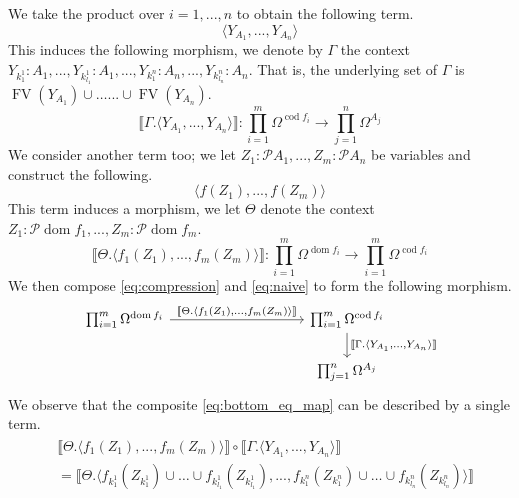 \documentclass{birkjour}
\theoremstyle{plain}
\theoremstyle{definition}
\newcommand{\call}[1]{\mathcal{#1}}
\newcommand{\lto}{\longrightarrow}
\begin{document}
	We take the product over $i = 1,...,n$ to obtain the following term.
	\begin{equation}
		\langle Y_{A_1},...,Y_{A_n}\rangle
	\end{equation}
	This induces the following morphism, we denote by $\Gamma$ the context $Y_{k_1^1}:A_1,...,Y_{k_{l_1}^1}:A_1,...,Y_{k_1^n}:A_n,...,Y_{k_{l_n}^n}:A_n$. That is, the underlying set of $\Gamma$ is $\operatorname{FV}(Y_{A_1}) \cup \hdots ... \cup \operatorname{FV}(Y_{A_n})$.
	\begin{equation}
		\llbracket \Gamma. \langle Y_{A_1},...,Y_{A_n}\rangle\rrbracket:  \prod_{i = 1}^m \Omega^{\operatorname{cod}f_i} \lto \prod_{j = 1}^n \Omega^{A_j}
	\end{equation}
	We consider another term too; we let $Z_1:\call{P}A_1,...,Z_{m}:\call{P}A_n$ be variables and construct the following.
	\begin{equation}
		\langle f(Z_1),...,f(Z_m)\rangle
	\end{equation}
	This term induces a morphism, we let $\Theta$ denote the context $Z_1:\call{P}\operatorname{dom}f_1,...,Z_{m}:\call{P}\operatorname{dom}f_m$.
	\begin{equation}\label{eq:naive}
		\llbracket \Theta. \langle f_1(Z_1),...,f_m(Z_m)\rangle \rrbracket: \prod_{i = 1}^m \Omega^{\operatorname{dom}f_i} \lto \prod_{i = 1}^m \Omega^{\operatorname{cod}f_i}
	\end{equation}
	We then compose \eqref{eq:compression} and \eqref{eq:naive} to form the following morphism.
	\begin{equation}\label{eq:bottom_eq_map}
		\begin{tikzcd}[column sep = huge]
			\prod_{i = 1}^m \Omega^{\operatorname{dom}f_i}\arrow[rr,"{\llbracket \Theta. \langle f_1(Z_1),...,f_m(Z_m)\rangle\rrbracket}"] && \prod_{i = 1}^m \Omega^{\operatorname{cod}f_i}\arrow[d,"{\llbracket \Gamma. \langle Y_{A_1},...,Y_{A_n}\rangle\rrbracket}"]\\
			&& \prod_{j = 1}^n \Omega^{A_j}
		\end{tikzcd}
	\end{equation}
	We observe that the composite \eqref{eq:bottom_eq_map} can be described by a single term.
	\begin{align}
		\begin{split}
			&\llbracket \Theta. \langle f_1(Z_1),...,f_m(Z_m)\rangle \rrbracket \circ \llbracket \Gamma . \langle Y_{A_1},...,Y_{A_n}\rangle \rrbracket \\
			&= \llbracket \Theta. \langle f_{k_1^1}(Z_{k_1^1}) \cup \hdots \cup f_{k_{l_1}^1}(Z_{k_{l_1}^1}),...,f_{k_1^n}(Z_{k_1^n}) \cup \hdots \cup f_{k_{l_n}^n}(Z_{k_{l_n}^n})\rangle \rrbracket
		\end{split}
	\end{align}
\end{document}
